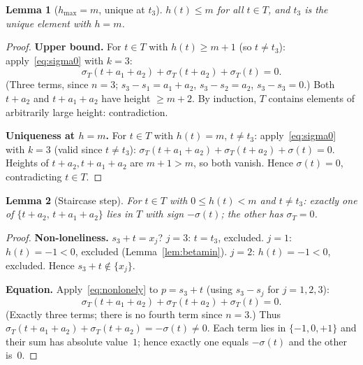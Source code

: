 \documentclass{article}
\newtheorem{lemma}{Lemma}
\begin{document}
\begin{lemma}[$h_{\max}=m$, unique at $t_3$]\label{lem:betamax}
$h(t)\le m$ for all $t\in T$, and $t_3$ is the unique element with $h=m$.
\end{lemma}
\begin{proof}
\textbf{Upper bound.}
For $t\in T$ with $h(t)\ge m+1$ (so $t\ne t_3$): apply~\eqref{eq:sigma0} with $k=3$:
\[
  \sigma_T(t+a_1+a_2)+\sigma_T(t+a_2)+\sigma_T(t)=0.
\]
(Three terms, since $n=3$; $s_3-s_1=a_1+a_2$, $s_3-s_2=a_2$, $s_3-s_3=0$.)
Both $t+a_2$ and $t+a_1+a_2$ have height $\ge m+2$.
By induction, $T$ contains elements of arbitrarily large height: contradiction.

\textbf{Uniqueness at $h=m$.}
For $t\in T$ with $h(t)=m$, $t\ne t_3$: apply~\eqref{eq:sigma0} with $k=3$
(valid since $t\ne t_3$):
$\sigma_T(t+a_1+a_2)+\sigma_T(t+a_2)+\sigma(t)=0$.
Heights of $t+a_2,t+a_1+a_2$ are $m+1>m$, so both vanish.
Hence $\sigma(t)=0$, contradicting $t\in T$.
\end{proof}

\begin{lemma}[Staircase step]\label{lem:step}
For $t\in T$ with $0\le h(t)<m$ and $t\ne t_3$:
exactly one of $\{t+a_2,\,t+a_1+a_2\}$ lies in $T$ with sign $-\sigma(t)$;
the other has $\sigma_T=0$.
\end{lemma}
\begin{proof}
\textbf{Non-loneliness.}
$s_3+t=x_j$?
$j=3$: $t=t_3$, excluded.
$j=1$: $h(t)=-1<0$, excluded (Lemma~\ref{lem:betamin}).
$j=2$: $h(t)=-1<0$, excluded.
Hence $s_3+t\notin\{x_j\}$.

\textbf{Equation.}
Apply~\eqref{eq:nonlonely} to $p=s_3+t$ (using $s_3-s_j$ for $j=1,2,3$):
\[
  \sigma_T(t+a_1+a_2)+\sigma_T(t+a_2)+\sigma_T(t)=0.
\]
(Exactly three terms; there is no fourth term since $n=3$.)
Thus $\sigma_T(t+a_1+a_2)+\sigma_T(t+a_2)=-\sigma(t)\ne 0$.
Each term lies in $\{-1,0,+1\}$ and their sum has absolute value~$1$;
hence exactly one equals $-\sigma(t)$ and the other is~$0$.
\end{proof}
\end{document}
